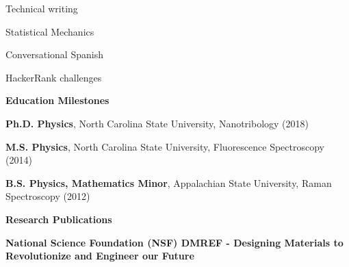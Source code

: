 \documentclass[letterpaper,final]{memoir}
\newcommand{\LargeSep}{\vspace{1.3em}}
\newcommand{\Sep}{\vspace{1.0em}}
\newcommand{\SmallSep}{\vspace{0.4em}}
\newcommand{\CVSection}[1]
	{\LARGE\textbf{#1}\par
	\SmallSep\normalsize}
\newcommand{\CVItem}[1]
	{\textbf{\color{Blue} #1}}
\begin{document}
\begin{multicols}{4}

    \begin{compactitem}[\color{Blue}$\circ$]
        

        \item Technical writing

        \SmallSep

        \item Statistical Mechanics
        \SmallSep
        

        \item Conversational Spanish
        \SmallSep
        

		\item HackerRank challenges

        
        
	\end{compactitem}

\end{multicols}

\LargeSep






\notoserif \CVSection{Education Milestones}
\normalfont

\Sep


\begin{compactitem}[\color{Blue}$\circ$]

\item \textbf{Ph.D. Physics}, North Carolina State University, Nanotribology (2018)
\SmallSep
\item \textbf{M.S. Physics}, North Carolina State University, Fluorescence Spectroscopy (2014)
\SmallSep
\item \textbf{B.S. Physics, Mathematics Minor}, Appalachian State University, Raman Spectroscopy (2012)



\end{compactitem}


\Sep



\notoserif \CVSection{Research Publications}

\normalfont

\SmallSep

\CVItem{National Science Foundation (NSF) DMREF - Designing Materials to Revolutionize and Engineer our Future} 
\end{document}
